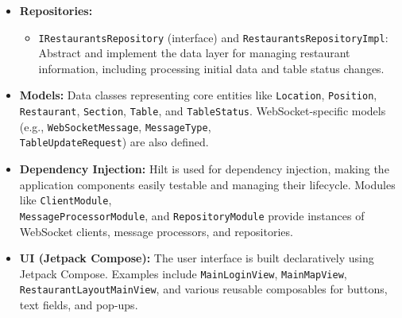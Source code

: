 \documentclass{article}
\begin{document}
\begin{itemize}
    \item \textbf{Repositories:}
    \begin{itemize}[leftmargin=2em]
        \item \texttt{IRestaurantsRepository} (interface) and \texttt{RestaurantsRepositoryImpl}: Abstract and implement the data layer for managing restaurant information, including processing initial data and table status changes.
    \end{itemize}

    \item \textbf{Models:} Data classes representing core entities like \texttt{Location}, \texttt{Position}, \texttt{Restaurant}, \texttt{Section}, \texttt{Table}, and \texttt{TableStatus}. WebSocket-specific models (e.g., \texttt{WebSocketMessage}, \texttt{MessageType},\\ \texttt{TableUpdateRequest}) are also defined.

    \item \textbf{Dependency Injection:} Hilt is used for dependency injection, making the application components easily testable and managing their lifecycle. Modules like \texttt{ClientModule}, \\ \texttt{MessageProcessorModule}, and \texttt{RepositoryModule} provide instances of WebSocket clients, message processors, and repositories.

    \item \textbf{UI (Jetpack Compose):} The user interface is built declaratively using Jetpack Compose. Examples include \texttt{MainLoginView}, \texttt{MainMapView}, \texttt{RestaurantLayoutMainView}, and various reusable composables for buttons, text fields, and pop-ups.
\end{itemize}
\end{document}
